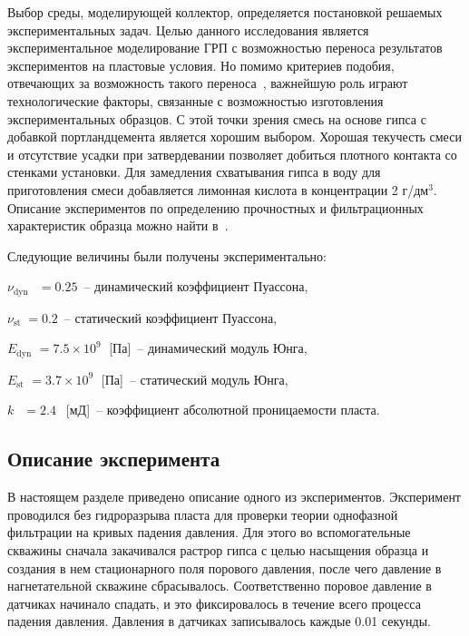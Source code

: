 Выбор среды, моделирующей коллектор, определяется постановкой решаемых экспериментальных задач. Целью данного исследования является экспериментальное моделирование ГРП с возможностью переноса результатов экспериментов на пластовые условия. Но помимо критериев подобия, отвечающих за возможность такого переноса~\cite{cleary1994}, важнейшую роль играют технологические факторы, связанные с возможностью изготовления экспериментальных образцов. С этой точки зрения смесь на основе гипса с добавкой портландцемента является хорошим выбором. Хорошая текучесть смеси и отсутствие усадки при затвердевании позволяет добиться плотного контакта со стенками установки. Для замедления схватывания гипса в воду для приготовления смеси добавляется лимонная кислота в концентрации 2 г/дм$^3$. Описание экспериментов по определению прочностных и фильтрационных характеристик образца можно найти  в~\cite{trimonova2017, trimonova2018}. 

Следующие величины были получены экспериментально:
\begin{description}
%
\item $\nu_\text{dyn} \;\;\,  = 0.25$~-- динамический коэффициент Пуассона,
\item $\nu_\text{st} \;= 0.2$~-- статический коэффициент Пуассона,
\item $E_\text{dyn} \,\,    = 7.5 \times 10^{9}\;$  [Па]~-- динамический модуль Юнга, 
\item $E_\text{st} \,\,    = 3.7 \times 10^{9}\;$  [Па]~-- статический модуль Юнга, 
\item $k \;\;\,    = 2.4 \;\,$  [мД]~-- коэффициент абсолютной проницаемости пласта.

%
\end{description}

\subsection{Описание эксперимента}

В настоящем разделе приведено описание одного из экспериментов. Эксперимент проводился без гидроразрыва пласта для  проверки теории однофазной фильтрации на кривых падения давления. Для этого во вспомогательные скважины сначала закачивался растрор гипса с целью насыщения образца и создания в нем стационарного поля порового давления, после чего давление в нагнетательной скважине сбрасывалось. Соответственно поровое давление в датчиках начинало спадать, и это фиксировалось в течение всего процесса падения давления. Давления в датчиках записывалось каждые 0.01 секунды. 

